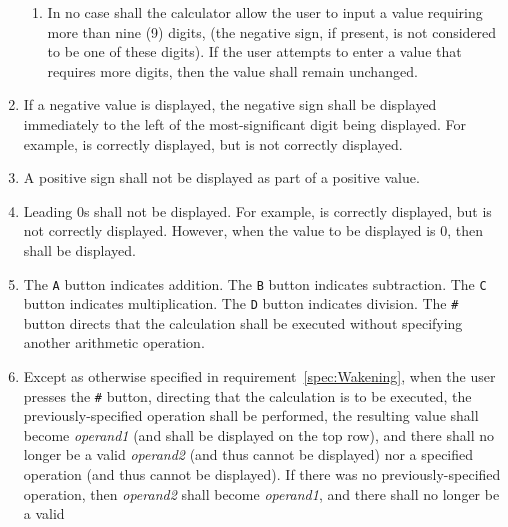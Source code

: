 \begin{enumerate}
\begin{enumerate}

    \item In no case shall the calculator allow the user to input a value requiring more than nine (9) digits, (the negative sign, if present, is not considered to be one of these digits). If the user attempts to enter a value that requires more digits, then the value shall remain unchanged.

    \end{enumerate}
\item \label{spec:Negative} If a negative value is displayed, the negative sign
    shall be displayed immediately to the left of the most-significant digit
    being displayed. For example,  is correctly displayed, but
     is not correctly displayed.
\item \label{spec:Positive} A positive sign shall not be displayed as part of a
    positive value.
\item \label{spec:LeadingZeroes} Leading 0s shall not be displayed. For
    example,  is correctly displayed, but  is
    not correctly displayed. However, when the value to be displayed is 0, then
     shall be displayed.
\item The \texttt{A} button indicates addition. The \texttt{B} button indicates
    subtraction. The \texttt{C} button indicates multiplication. The \texttt{D}
    button indicates division. The \texttt{\#} button directs that the
    calculation shall be executed without specifying another arithmetic
    operation.
\item Except as otherwise specified in requirement~\ref{spec:Wakening}, when
    the user presses the \texttt{\#} button, directing that the calculation is
    to be executed, the previously-specified operation shall be
    performed, the resulting value shall become \textit{operand1} (and shall be
    displayed on the top row), and there shall no longer be a valid \textit{operand2} (and thus cannot be displayed) nor a specified operation (and thus cannot be displayed). If
    there was no previously-specified operation, then \textit{operand2} shall
    become \textit{operand1}, and there shall no longer be a valid

\end{enumerate}
